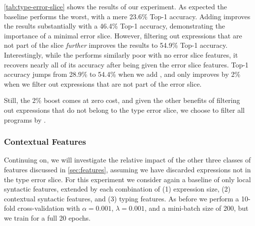 \autoref{tab:type-error-slice} shows the results of our experiment.
%
As expected the baseline performs the worst, with a mere 23.6\% \linear
Top-1 accuracy.
%
Adding \InSlice improves the results substantially with a 46.4\% \linear Top-1
accuracy, demonstrating the importance of a minimal error slice.
%
However, filtering out expressions that are not part of the slice
\emph{further} improves the results to 54.9\% \linear Top-1 accuracy.
%
Interestingly, while the \hiddenFH performs similarly poor with no error
slice features, it recovers nearly all of its accuracy after being given
the error slice features.
%
Top-1 accuracy jumps from 28.9\% to 54.4\% when we add \InSlice, and only
improves by 2\% when we filter out expressions that are not part of the
error slice.

Still, the 2\% boost comes at zero cost, and given the other benefits
of filtering out expressions that do not belong to the type error slice,
we choose to filter all programs by \InSlice.

\subsubsection{Contextual Features}
\label{sec:contextual-features}

Continuing on, we will investigate the relative impact of the other
three classes of features discussed in \autoref{sec:features}, assuming
we have discarded expressions not in the type error slice.
%
For this experiment we consider again a baseline of only local syntactic
features, extended by each combination of
%
(1) expression size,
(2) contextual syntactic features, and
(3) typing features.
%
As before we perform a 10-fold cross-validation with $\alpha = 0.001$,
$\lambda = 0.001$, and a mini-batch size of 200, but we
train for a full 20 epochs.

